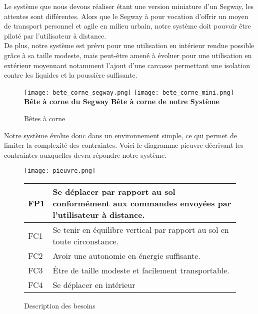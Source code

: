 \documentclass[oneside,a4paper,12pt]{article}
\begin{document}
	Le système que nous devons réaliser étant une version miniature d’un Segway, les attentes sont différentes. Alors que le Segway à pour vocation d’offrir un moyen de transport personnel et agile en milieu urbain, notre système doit pouvoir être piloté par l’utilisateur à distance.\\
	
	De plus, notre système est prévu pour une utilisation en intérieur rendue possible grâce à sa taille modeste, mais peut-être amené à évoluer pour une utilisation en extérieur moyennant notamment l’ajout d’une carcasse permettant une isolation contre les liquides et la poussière suffisante.
	
	\begin{figure}[h]
		\texttt{[image: bete\_corne\_segway.png]}
		\hspace{0cm}
		\texttt{[image: bete\_corne\_mini.png]}
		\hspace*{1cm}
		\textbf{Bête à corne du Segway}
		\hspace*{1cm}
		\textbf{Bête à corne de notre Système}
		
		\caption{Bêtes à corne}
	\end{figure}

	Notre système évolue donc dans un environnement simple, ce qui permet de limiter la complexité des contraintes.
	Voici le diagramme pieuvre décrivant les contraintes auxquelles devra répondre notre système.
	

	
	\begin{figure}[h]
		\centering
		\texttt{[image: pieuvre.png]}
		
		\begin{tabular}{|p{1cm}|p{10cm}|}
			\hline
			FP1 & Se déplacer par rapport au sol conformément aux commandes envoyées par l’utilisateur à distance.\\
			\hline
			FC1 & Se tenir en équilibre vertical par rapport au sol en toute circonstance.\\
			\hline
			FC2 & Avoir une autonomie en énergie suffisante.\\
			\hline
			FC3 & Être de taille modeste et facilement transportable.\\
			\hline
			FC4 & Se déplacer en intérieur\\
			\hline
		\end{tabular}		
		
		\caption{Description des besoins}
	\end{figure}
\end{document}
